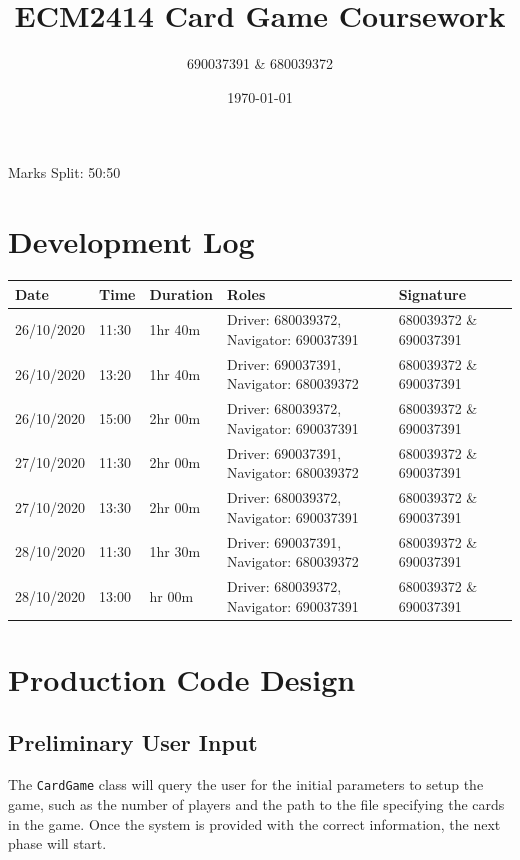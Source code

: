 \documentclass[a4paper, 11pt] {article}
\begin{document}
\title{ECM2414 Card Game Coursework}
\author{690037391 \& 680039372}
\date{\today}
\maketitle
	\begin{center}
		Marks Split: 50:50
	\end{center}
\pagebreak
\section*{Development Log}
\begin{center}
\begin{table}[H]
\begin{tabular}{|l|l|l|l|l|}
\hline
Date           & Time     & Duration  & Roles                                                 & Signature                       \\ \hline
 26/10/2020 & 11:30    & 1hr 40m  & Driver: 680039372, Navigator: 690037391 & 680039372 \& 690037391 \\ \hline
 26/10/2020 & 13:20    & 1hr 40m  & Driver: 690037391, Navigator: 680039372 & 680039372 \& 690037391 \\ \hline
 26/10/2020 & 15:00    & 2hr 00m & Driver: 680039372, Navigator: 690037391 & 680039372 \& 690037391 \\ \hline
 27/10/2020 & 11:30    & 2hr 00m & Driver: 690037391, Navigator: 680039372 & 680039372 \& 690037391 \\ \hline
 27/10/2020 & 13:30 & 2hr 00m & Driver: 680039372, Navigator: 690037391 & 680039372 \& 690037391 \\ \hline
 28/10/2020 & 11:30 & 1hr 30m & Driver: 690037391, Navigator: 680039372 & 680039372 \& 690037391 \\ \hline
 28/10/2020 & 13:00 & hr 00m & Driver: 680039372, Navigator: 690037391 & 680039372 \& 690037391 \\ \hline
\end{tabular}
\end{table}
\end{center}
\FloatBarrier
\pagebreak
\section*{Production Code Design}
\subsection*{Preliminary User Input}
The \texttt{CardGame} class will query the user for the initial parameters to setup the game, such as the number of players and the path to the file specifying the cards in the game. Once the system is provided with the correct information, the next phase will start.
\end{document}
